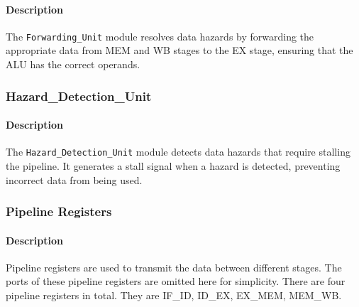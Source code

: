 \documentclass[a4paper,12pt]{article}
\begin{document}
\paragraph{Description}
The \texttt{Forwarding\_Unit} module resolves data hazards by forwarding the appropriate data from MEM and WB stages to the EX stage, ensuring that the ALU has the correct operands.

\subsubsection{Hazard\_Detection\_Unit}

\begin{center}
\end{center}

\paragraph{Description}
The \texttt{Hazard\_Detection\_Unit} module detects data hazards that require stalling the pipeline. It generates a stall signal when a hazard is detected, preventing incorrect data from being used.

\subsubsection{Pipeline Registers}

\paragraph{Description}
Pipeline registers are used to transmit the data between different stages. The ports of these pipeline registers are omitted here for simplicity. There are four pipeline registers in total. They are IF\_ID, ID\_EX, EX\_MEM, MEM\_WB. 
\end{document}
